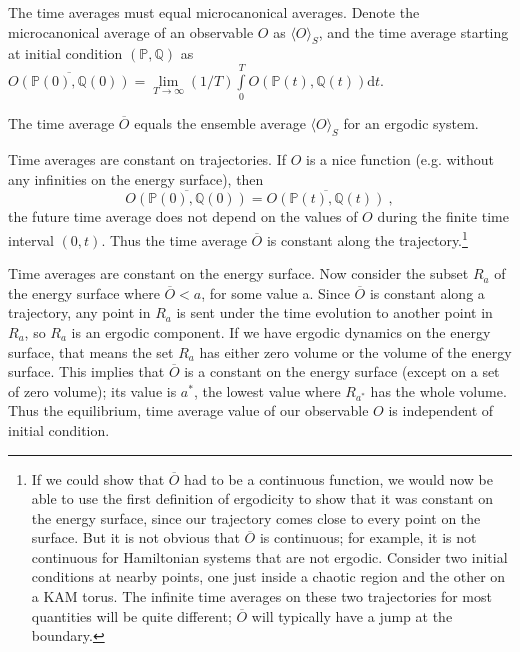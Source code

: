 \documentclass[12pt,a4paper]{article}
\newcommand{\dif}{\mathrm{d}}
\begin{document}
The time averages must equal microcanonical averages. Denote the microcanonical average of an observable $O$ as $\langle O\rangle_S$, and the time average starting at initial condition $(\mathbb P, \mathbb Q)$ as $\overline{O(\mathbb P(0), \mathbb Q(0))} = \lim\limits_{T \rightarrow \infty} (1/T ) \int\limits_0^T O(\mathbb P(t), \mathbb  Q(t)) \dif t$.

The time average $\overline{O}$ equals the ensemble average $\langle O\rangle_S$ for an ergodic system. 

Time averages are constant on trajectories. If $O$ is a nice function (e.g. without any infinities on the energy surface), then
\begin{equation}
\overline{O(\mathbb P(0), \mathbb Q(0))} = \overline{O(\mathbb P(t), \mathbb Q(t))} ~,
\end{equation}
the future time average does not depend on the values of $O$ during the finite time interval $(0, t)$. Thus the time average $\overline{O}$ is constant along the trajectory.\footnote{If we could show that $\overline{O}$ had to be a continuous function, we would now be able to use the first definition of ergodicity to show that it was constant on the energy surface, since our trajectory comes close to every point on the surface. But it is not obvious that $\overline{O}$ is continuous; for example, it
is not continuous for Hamiltonian systems that are not ergodic. Consider two initial conditions at nearby points, one just inside a chaotic region and the other on a KAM torus. The infinite time averages on these two trajectories for most quantities will be quite different; $\overline{O}$ will typically have a jump at the boundary.}

Time averages are constant on the energy surface. Now consider the subset $R_a$ of the energy surface where $\overline{O} < a$, for some value a. Since $\overline{O}$ is constant along a trajectory, any point in $R_a$ is sent under the time evolution to another point in $R_a$, so $R_a$ is an ergodic component. If we have ergodic dynamics on the energy surface, that means the set  $R_a$ has either zero volume or the volume of the energy surface. This implies that $\overline{O}$ is a constant on the energy surface (except on a set of zero volume); its value is $a^\ast$, the lowest value where $R_{a^\ast}$ has the whole volume. Thus the equilibrium, time average value of our observable $O$ is independent of initial condition. 
\end{document}
